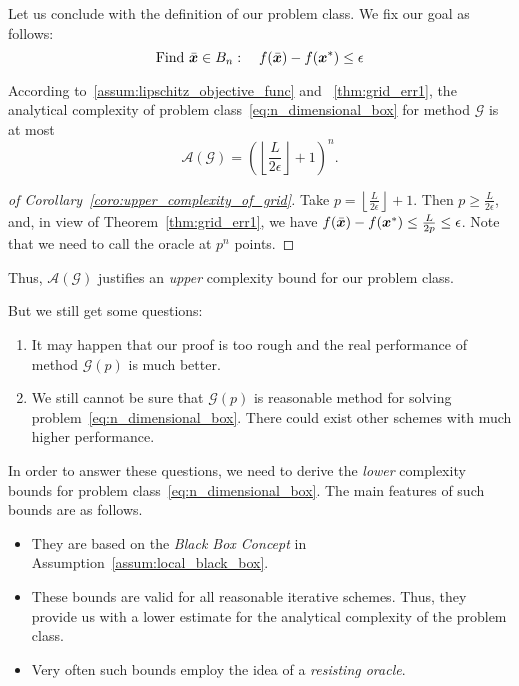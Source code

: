 Let us conclude with the definition of our problem class. We fix our goal as follows:
\begin{equation}\label{eq:goal_n_box}
    \text{Find} ~ \bar{\bm{x}} \in B_n : \quad f(\bar{\bm{x}}) - f(\bm{x}^*) \le \epsilon
\end{equation}

\begin{coro}\label{coro:upper_complexity_of_grid}
    According to~\ref{assum:lipschitz_objective_func} and
    ~\ref{thm:grid_err1}, the analytical complexity of problem 
    class~\ref{eq:n_dimensional_box} for method \(\mathscr{G}\) is at most
    \[
        \mathscr{A}(\mathscr{G}) = \left( \left\lfloor \frac{L}{2\epsilon} \right\rfloor +1 \right)^n .
    \]
\end{coro}

\begin{proof}[of Corollary~\ref{coro:upper_complexity_of_grid}]
    Take \(p = \left\lfloor \frac{L}{2\epsilon} \right\rfloor +1\). Then \(p \ge \frac{L}{2\epsilon}\), and, in view of Theorem~\ref{thm:grid_err1}, 
    we have \(f(\bar{\bm{x}}) - f(\bm{x}^*) \le \frac{L}{2p} \le \epsilon\). Note that we need to call the oracle at \(p^n\) points.
\end{proof}

Thus, \(\mathscr{A}(\mathscr{G})\) justifies an \emph{upper} complexity bound for our problem class.

But we still get some questions:
\begin{enumerate}
    \item It may happen that our proof is too rough and the real performance of method \(\mathscr{G}(p)\) is much better.
    \item We still cannot be sure that \(\mathscr{G}(p)\) is reasonable method for solving problem~\ref{eq:n_dimensional_box}. There could exist other schemes with much higher performance.
\end{enumerate}
In order to answer these questions, we need to derive the \emph{lower} complexity bounds for problem class~\ref{eq:n_dimensional_box}. The main features of such bounds are as follows.
\begin{itemize}
    \item They are based on the \emph{Black Box Concept} in Assumption~\ref{assum:local_black_box}.
    \item These bounds are valid for all reasonable iterative schemes. Thus, they provide us with a lower estimate for the analytical complexity of the problem class.
    \item Very often such bounds employ the idea of a \emph{resisting oracle}.
\end{itemize}

